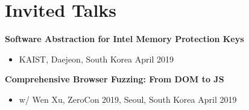 \section*{Invited Talks}
\begin{description}
    \item \textbf{Software Abstraction for Intel Memory Protection Keys}
      \begin{itemize}
         \item KAIST, Daejeon, South Korea \dotfill April 2019
      \end{itemize}

    \item \textbf{Comprehensive Browser Fuzzing: From DOM to JS}
      \begin{itemize}
          \item w/ Wen Xu, ZeroCon 2019, Seoul, South Korea \dotfill April 2019
      \end{itemize}
      
\end{description}
